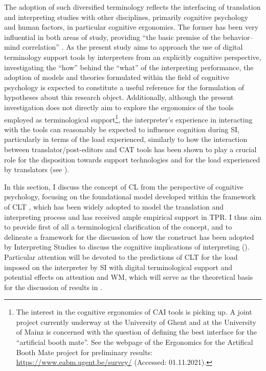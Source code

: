 The adoption of such diversified terminology reflects the interfacing of translation and interpreting studies with other disciplines, primarily cognitive psychology and human factors, in particular cognitive ergonomics. The former has been very influential in both areas of study, providing ``the basic premise of the behavior– mind correlation'' \citep[23]{jakobsen_TPR_2017}. As the present study aims to approach the use of digital terminology support tools by interpreters from an explicitly cognitive perspective, investigating the ``how'' behind the ``what'' of the interpreting performance, the adoption of models and theories formulated within the field of cognitive psychology is expected to constitute a useful reference for the formulation of hypotheses about this research object. Additionally, although the present investigation does not directly aim to explore the ergonomics of the tools employed as terminological support\footnote{The interest in the cognitive ergonomics of CAI tools is picking up. A joint project currently underway at the University of Ghent and at the University of Mainz is concerned with the question of defining the best interface for the ``artificial booth mate''. See the webpage of the Ergonomics for the Artifical Booth Mate project \citep{EABM2021} for preliminary results: \url{https://www.eabm.ugent.be/survey/} (Accessed: 01.11.2021).}, the interpreter's experience in interacting with the tools can reasonably be expected to influence cognition during SI, particularly in terms of the load experienced, similarly to how the interaction between translator/post-editors and CAT tools has been shown to play a crucial role for the disposition towards support technologies and for the load experienced by translators (see \citealt{obrien_translation_2012,OBrien_Ehrensberger-Dow_Connolly_Hasler_2017,moorkens_assessing_2016}).


In this section, I discuss the concept of CL from the perspective of cognitive psychology, focusing on the foundational model developed within the framework of CLT \citep{chandler_cognitive_1991}, which has been widely adopted to model the translation and interpreting process and has received ample empirical support in TPR. I thus aim to provide first of all a terminological clarification of the concept, and to delineate a framework for the discussion of how the construct has been adopted by Interpreting Studies to discuss the cognitive implications of interpreting (). Particular attention will be devoted to the predictions of CLT for the load imposed on the interpreter by SI with digital terminological support and potential effects on attention and WM, which will serve as the theoretical basis for the discussion of results in .
